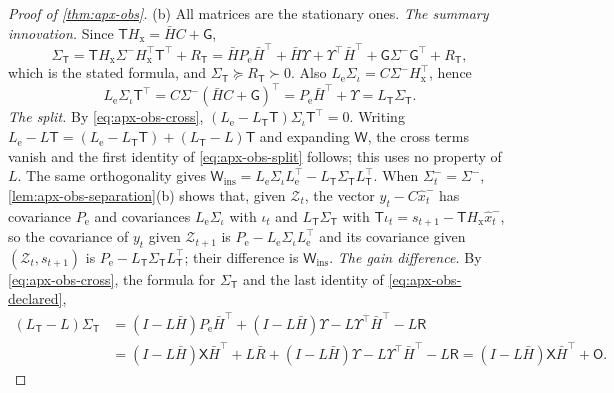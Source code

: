 \begin{proof}[Proof of \cref{thm:apx-obs}]
(b) All matrices are the stationary ones. \emph{The summary innovation.} Since $\mathsf TH_{\mathrm x}=\bar HC+\mathsf G$,
\begin{equation*}
\Sigma_{\mathsf T}=\mathsf TH_{\mathrm x}\Sigma^-H_{\mathrm x}^\top\mathsf T^\top+R_{\mathsf T}=\bar HP_{\mathrm e}\bar H^\top+\bar H\Upsilon+\Upsilon^\top\bar H^\top+\mathsf G\Sigma^-\mathsf G^\top+R_{\mathsf T},
\end{equation*}
which is the stated formula, and $\Sigma_{\mathsf T}\succeq R_{\mathsf T}\succ0$. Also $L_{\mathrm e}\Sigma_\iota=C\Sigma^-H_{\mathrm x}^\top$, hence
\begin{equation}\label{eq:apx-obs-cross}
L_{\mathrm e}\Sigma_\iota\mathsf T^\top=C\Sigma^-(\bar HC+\mathsf G)^\top=P_{\mathrm e}\bar H^\top+\Upsilon=L_{\mathsf T}\Sigma_{\mathsf T} .
\end{equation}
\emph{The split.} By \eqref{eq:apx-obs-cross}, $(L_{\mathrm e}-L_{\mathsf T}\mathsf T)\Sigma_\iota\mathsf T^\top=0$. Writing $L_{\mathrm e}-L\mathsf T=(L_{\mathrm e}-L_{\mathsf T}\mathsf T)+(L_{\mathsf T}-L)\mathsf T$ and expanding $\mathsf W$, the cross terms vanish and the first identity of \eqref{eq:apx-obs-split} follows; this uses no property of $L$. The same orthogonality gives $\mathsf W_{\mathrm{ins}}=L_{\mathrm e}\Sigma_\iota L_{\mathrm e}^\top-L_{\mathsf T}\Sigma_{\mathsf T}L_{\mathsf T}^\top$. When $\Sigma^-_t=\Sigma^-$, \cref{lem:apx-obs-separation}(b) shows that, given $\mathcal Z_t$, the vector $y_t-C\hat x^-_t$ has covariance $P_{\mathrm e}$ and covariances $L_{\mathrm e}\Sigma_\iota$ with $\iota_t$ and $L_{\mathsf T}\Sigma_{\mathsf T}$ with $\mathsf T\iota_t=s_{t+1}-\mathsf TH_{\mathrm x}\hat x^-_t$, so the covariance of $y_t$ given $\mathcal Z_{t+1}$ is $P_{\mathrm e}-L_{\mathrm e}\Sigma_\iota L_{\mathrm e}^\top$ and its covariance given $(\mathcal Z_t,s_{t+1})$ is $P_{\mathrm e}-L_{\mathsf T}\Sigma_{\mathsf T}L_{\mathsf T}^\top$; their difference is $\mathsf W_{\mathrm{ins}}$. \emph{The gain difference.} By \eqref{eq:apx-obs-cross}, the formula for $\Sigma_{\mathsf T}$ and the last identity of \eqref{eq:apx-obs-declared},
\begin{equation*}
\begin{aligned}
(L_{\mathsf T}-L)\Sigma_{\mathsf T}&=(I-L\bar H)P_{\mathrm e}\bar H^\top+(I-L\bar H)\Upsilon-L\Upsilon^\top\bar H^\top-L\mathsf R\\
&=(I-L\bar H)\mathsf X\bar H^\top+L\bar R+(I-L\bar H)\Upsilon-L\Upsilon^\top\bar H^\top-L\mathsf R=(I-L\bar H)\mathsf X\bar H^\top+\mathsf O .
\end{aligned}

\end{equation*}
\end{proof}
